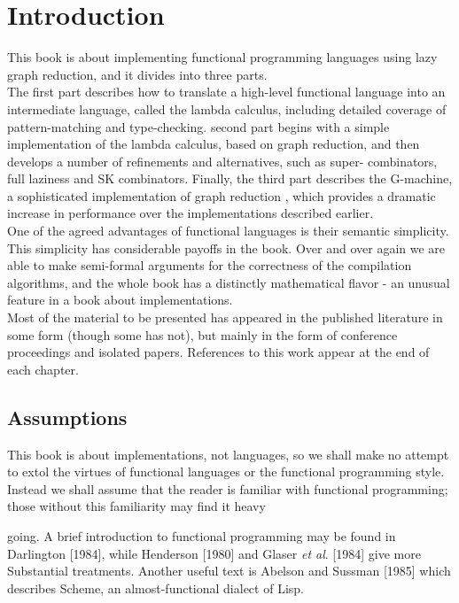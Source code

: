 \documentclass[11pt,a4paper]{book}
\begin{document}
\chapter{Introduction}
This book is about implementing functional programming languages using 
lazy graph reduction, and it divides into three parts.\\
 
The first part describes how to translate a high-level functional language 
into an intermediate language, called the lambda calculus, including detailed 
coverage of pattern-matching and type-checking. second part begins with 
a simple implementation of the lambda calculus, based on graph reduction, 
and then develops a number of refinements and alternatives, such as super- 
combinators, full laziness and SK combinators. Finally, the third part 
describes the G-machine, a sophisticated implementation of graph reduction , 
which provides a dramatic increase in performance over the implementations 
described earlier.\\
 
One of the agreed advantages of functional languages is their semantic 
simplicity. This simplicity has considerable payoffs in the book. Over and 
over again we are able to make semi-formal arguments for the correctness of 
the compilation algorithms, and the whole book has a distinctly mathematical 
flavor - an unusual feature in a book about implementations.\\

Most of the material to be presented has appeared in the published 
literature in some form (though some has not), but mainly in the form of 
conference proceedings and isolated papers. References to this work appear 
at the end of each chapter.\\

\section{Assumptions}
This book is about implementations, not languages, so we shall make no 
attempt to extol the virtues of functional languages or the functional 
programming style. Instead we shall assume that the reader is familiar with 
functional programming; those without this familiarity may find it heavy 
\newpage

\noindent going. A brief introduction to functional programming may be found in 
Darlington [1984], while Henderson [1980] and Glaser \textit{et al}. [1984] give more 
Substantial treatments. Another useful text is Abelson and Sussman [1985] 
which describes Scheme, an almost-functional dialect of Lisp.\\
\end{document}
